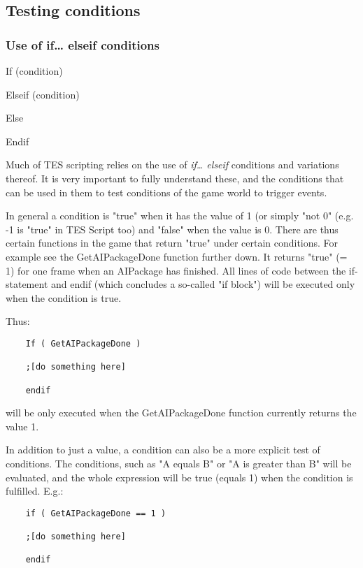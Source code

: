 
\hypertarget{testing-conditions}{%
\subsection{Testing conditions}\label{testing-conditions}}

\hypertarget{use-of-if-elseif-conditions}{%
\subsubsection{Use of if\ldots{} elseif
conditions}\label{use-of-if-elseif-conditions}}

	If (condition)
	
	Elseif (condition)
	
	Else
	
	Endif

Much of TES scripting relies on the use of \emph{if\ldots{} elseif}
conditions and variations thereof. It is very important to fully
understand these, and the conditions that can be used in them to test
conditions of the game world to trigger events.

In general a condition is "true" when it has the value of 1 (or simply
"not 0" (e.g. -1 is "true" in TES Script too) and "false" when the value
is 0. There are thus certain functions in the game that return "true"
under certain conditions. For example see the GetAIPackageDone function
further down. It returns "true" (= 1) for one frame when an AIPackage
has finished. All lines of code between the if-statement and endif
(which concludes a so-called "if block") will be executed only when the
condition is true.

Thus:

\begin{lstlisting}
	If ( GetAIPackageDone )
	
	;[do something here]
	
	endif
\end{lstlisting}

will be only executed when the GetAIPackageDone function currently
returns the value 1.

In addition to just a value, a condition can also be a more explicit
test of conditions. The conditions, such as "A equals B" or "A is
greater than B" will be evaluated, and the whole expression will be true
(equals 1) when the condition is fulfilled. E.g.:

\begin{lstlisting}
	if ( GetAIPackageDone == 1 )
	
	;[do something here]
	
	endif
\end{lstlisting}


